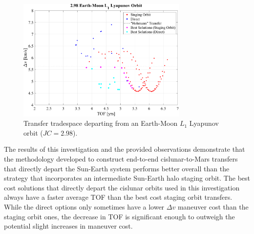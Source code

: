 \begin{figure}[ht]
    \centering
    \includegraphics[width=0.75\textwidth]{figures/TradeSpace_L1Lyapunov_2_98.pdf}
    \caption{Transfer tradespace departing from an Earth-Moon $L_{1}$ Lyapunov orbit ($JC=2.98$).}
    \label{fig:fewDirect}
\end{figure}

The results of this investigation and the provided observations demonstrate that the methodology
developed to construct end-to-end cislunar-to-Mars transfers that directly depart the Sun-Earth
system performs better overall than the strategy that incorporates an intermediate Sun-Earth halo
staging orbit. The best cost solutions that directly depart the cislunar orbits used in this
investigation always have a faster average TOF than the best cost staging orbit transfers. While
the direct options only sometimes have a lower $\Delta v$ maneuver cost than the staging orbit
ones, the decrease in TOF is significant enough to outweigh the potential slight increases in
maneuver cost.
